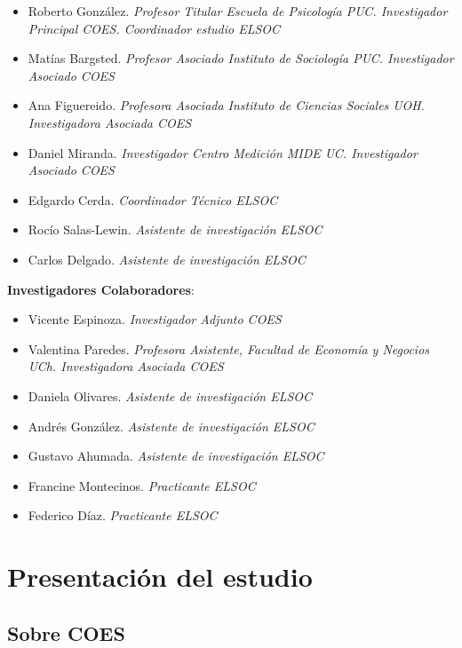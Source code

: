 \documentclass[
  12pt,
]{book}
\providecommand{\tightlist}{%
  \setlength{\itemsep}{0pt}\setlength{\parskip}{0pt}}
\begin{document}
\begin{itemize}
\tightlist
\item
  Roberto González. \emph{Profesor Titular Escuela de Psicología PUC. Investigador Principal COES. Coordinador estudio ELSOC}
\item
  Matías Bargsted. \emph{Profesor Asociado Instituto de Sociología PUC. Investigador Asociado COES}
\item
  Ana Figuereido. \emph{Profesora Asociada Instituto de Ciencias Sociales UOH. Investigadora Asociada COES}
\item
  Daniel Miranda. \emph{Investigador Centro Medición MIDE UC. Investigador Asociado COES}
\item
  Edgardo Cerda. \emph{Coordinador Técnico ELSOC}
\item
  Rocío Salas-Lewin. \emph{Asistente de investigación ELSOC}
\item
  Carlos Delgado. \emph{Asistente de investigación ELSOC}
\end{itemize}

\textbf{Investigadores Colaboradores}:

\begin{itemize}
\tightlist
\item
  Vicente Espinoza. \emph{Investigador Adjunto COES}
\item
  Valentina Paredes. \emph{Profesora Asistente, Facultad de Economía y Negocios UCh. Investigadora Asociada COES}
\item
  Daniela Olivares. \emph{Asistente de investigación ELSOC}
\item
  Andrés González. \emph{Asistente de investigación ELSOC}
\item
  Gustavo Ahumada. \emph{Asistente de investigación ELSOC}
\item
  Francine Montecinos. \emph{Practicante ELSOC}
\item
  Federico Díaz. \emph{Practicante ELSOC}
\end{itemize}

\hypertarget{presentaciuxf3n-del-estudio}{%
\chapter{Presentación del estudio}\label{presentaciuxf3n-del-estudio}}

\hypertarget{sobre-coes}{%
\section{Sobre COES}\label{sobre-coes}}
\end{document}
